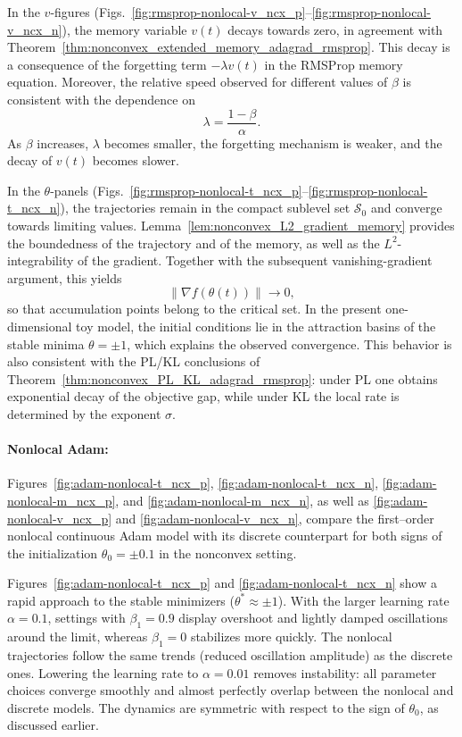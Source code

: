 \documentclass{article} %
\begin{document}
In the $v$-figures (Figs.~\ref{fig:rmsprop-nonlocal-v_ncx_p}--\ref{fig:rmsprop-nonlocal-v_ncx_n}), the memory variable $v(t)$ decays towards zero, in agreement with Theorem~\ref{thm:nonconvex_extended_memory_adagrad_rmsprop}. This decay is a consequence of the forgetting term $-\lambda v(t)$ in the RMSProp memory equation. Moreover, the relative speed observed for different values of $\beta$ is consistent with the dependence on 
\[
    \lambda=\frac{1-\beta}{\alpha}.
\]
As $\beta$ increases, $\lambda$ becomes smaller, the forgetting mechanism is weaker, and the decay of $v(t)$ becomes slower.

In the $\theta$-panels (Figs.~\ref{fig:rmsprop-nonlocal-t_ncx_p}--\ref{fig:rmsprop-nonlocal-t_ncx_n}), the trajectories remain in the compact sublevel set $\mathcal S_0$ and converge towards limiting values. Lemma~\ref{lem:nonconvex_L2_gradient_memory} provides the boundedness of the trajectory and of the memory, as well as the $L^2$-integrability of the gradient. Together with the subsequent vanishing-gradient argument, this yields 
\[
    \|\nabla f(\theta(t))\|\to0,
\]
so that accumulation points belong to the critical set. In the present one-dimensional toy model, the initial conditions lie in the attraction basins of the stable minima $\theta=\pm1$, which explains the observed convergence. This behavior is also consistent with the PL/KL conclusions of Theorem~\ref{thm:nonconvex_PL_KL_adagrad_rmsprop}: under PL one obtains exponential decay of the objective gap, while under KL the local rate is determined by the exponent $\sigma$.

\paragraph{Nonlocal Adam:} Figures~\ref{fig:adam-nonlocal-t_ncx_p}, \ref{fig:adam-nonlocal-t_ncx_n}, \ref{fig:adam-nonlocal-m_ncx_p}, and \ref{fig:adam-nonlocal-m_ncx_n}, as well as \ref{fig:adam-nonlocal-v_ncx_p} and \ref{fig:adam-nonlocal-v_ncx_n}, compare the first–order nonlocal continuous Adam model with its discrete counterpart for both signs of the initialization \(\theta_0=\pm 0.1\) in the nonconvex setting. 

Figures~\ref{fig:adam-nonlocal-t_ncx_p} and \ref{fig:adam-nonlocal-t_ncx_n} show a rapid approach to the stable minimizers (\(\theta^*\approx \pm 1\)). With the larger learning rate \(\alpha=0.1\), settings with \(\beta_1=0.9\) display overshoot and lightly damped oscillations around the limit, whereas \(\beta_1=0\) stabilizes more quickly. The nonlocal trajectories follow the same trends (reduced oscillation amplitude) as the discrete ones. Lowering the learning rate to \(\alpha=0.01\) removes instability: all parameter choices converge smoothly and almost perfectly overlap between the nonlocal and discrete models. The dynamics are symmetric with respect to the sign of \(\theta_0\), as discussed earlier.
\end{document}
